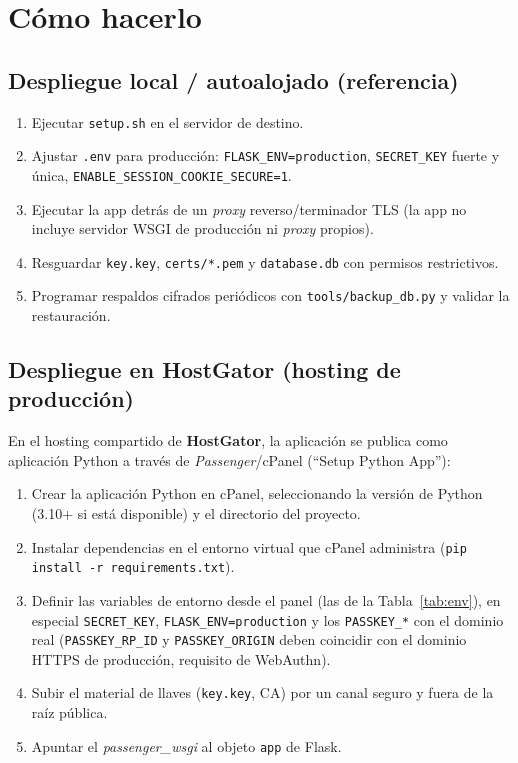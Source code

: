 \documentclass[10pt,letterpaper]{report}
\begin{document}
\section{C\'omo hacerlo}
\subsection*{Despliegue local / autoalojado (referencia)}
\begin{enumerate}
  \item Ejecutar \texttt{setup.sh} en el servidor de destino.
  \item Ajustar \texttt{.env} para producci\'on: \texttt{FLASK\_ENV=production}, \texttt{SECRET\_KEY}
  fuerte y \'unica, \texttt{ENABLE\_SESSION\_COOKIE\_SECURE=1}.
  \item Ejecutar la app detr\'as de un \emph{proxy} reverso/terminador TLS (la app no incluye servidor
  WSGI de producci\'on ni \emph{proxy} propios).
  \item Resguardar \texttt{key.key}, \texttt{certs/*.pem} y \texttt{database.db} con permisos
  restrictivos.
  \item Programar respaldos cifrados peri\'odicos con \texttt{tools/backup\_db.py} y validar la
  restauraci\'on.
\end{enumerate}

\subsection*{Despliegue en HostGator (hosting de producci\'on)}
En el hosting compartido de \textbf{HostGator}, la aplicaci\'on se publica como aplicaci\'on Python a
trav\'es de \emph{Passenger}/cPanel (``Setup Python App''):
\begin{enumerate}
  \item Crear la aplicaci\'on Python en cPanel, seleccionando la versi\'on de Python (3.10+ si est\'a
  disponible) y el directorio del proyecto.
  \item Instalar dependencias en el entorno virtual que cPanel administra (\texttt{pip install -r
  requirements.txt}).
  \item Definir las variables de entorno desde el panel (las de la Tabla~\ref{tab:env}), en especial
  \texttt{SECRET\_KEY}, \texttt{FLASK\_ENV=production} y los \texttt{PASSKEY\_*} con el dominio real
  (\texttt{PASSKEY\_RP\_ID} y \texttt{PASSKEY\_ORIGIN} deben coincidir con el dominio HTTPS de
  producci\'on, requisito de WebAuthn).
  \item Subir el material de llaves (\texttt{key.key}, CA) por un canal seguro y fuera de la ra\'iz
  p\'ublica.
  \item Apuntar el \emph{passenger\_wsgi} al objeto \texttt{app} de Flask.
\end{enumerate}
\end{document}
